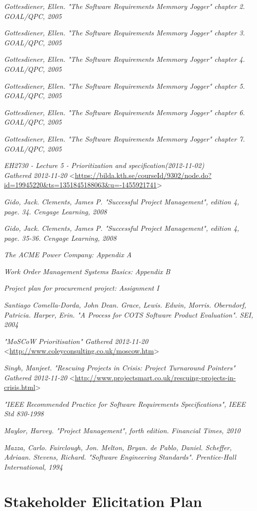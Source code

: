 \documentclass[a4paper]{article}
\begin{document}
\begin{thebibliography}{99}     
	
 \emph{Gottesdiener, Ellen. \textsl{"The Software Requirements Memmory Jogger" chapter 2}. GOAL/QPC, 2005}

 \emph{Gottesdiener, Ellen. \textsl{"The Software Requirements Memmory Jogger" chapter 3}. GOAL/QPC, 2005}

 \emph{Gottesdiener, Ellen. \textsl{"The Software Requirements Memmory Jogger" chapter 4}. GOAL/QPC, 2005}

 \emph{Gottesdiener, Ellen. \textsl{"The Software Requirements Memmory Jogger" chapter 5}. GOAL/QPC, 2005}

 \emph{Gottesdiener, Ellen. \textsl{"The Software Requirements Memmory Jogger" chapter 6}. GOAL/QPC, 2005}

 \emph{Gottesdiener, Ellen. \textsl{"The Software Requirements Memmory Jogger" chapter 7}. GOAL/QPC, 2005}

 \emph{EH2730 - Lecture 5 - \textsl{Prioritization and specification(2012-11-02)}\\Gathered 2012-11-20} <\url{https://bilda.kth.se/courseId/9302/node.do?id=19945220&ts=1351845188063&u=-1455921741}>

 \emph{Gido, Jack. Clements, James P. \textsl{"Successful Project Management", edition 4, page. 34}. Cengage Learning, 2008}

 \emph{Gido, Jack. Clements, James P. \textsl{"Successful Project Management", edition 4, page. 35-36}. Cengage Learning, 2008}    

 \emph{The ACME Power Company: Appendix A}

 \emph{Work Order Management Systems Basics: Appendix B}

 \emph{Project plan for procurement project: Assignment I}    

 \emph{Santiago Comella-Dorda, John Dean. Grace, Lewis. Edwin, Morris. Oberndorf, Patricia. Harper, Erin. \textsl{"A Process for COTS Software Product Evaluation"}. SEI, 2004}

 \emph{\textsl{"MoSCoW Prioritisation"} Gathered 2012-11-20} <\url{http://www.coleyconsulting.co.uk/moscow.htm}>

 \emph{Singh, Manjeet. \textsl{"Rescuing Projects in Crisis: Project Turnaround Pointers"} Gathered 2012-11-20} <\url{http://www.projectsmart.co.uk/rescuing-projects-in-crisis.html}> 

 \emph{\textsl{"IEEE Recommended Practice for Software Requirements Specifications", IEEE Std 830-1998}  }      

 \emph{Maylor, Harvey. \textsl{"Project Management", forth edition}. Financial Times, 2010}

 \emph{Mazza, Carlo. Fairclough, Jon. Melton, Bryan. de Pablo, Daniel. Scheffer, Adriaan. Stevens, Richard. \textsl{"Software Engineering Standards"}. Prentice-Hall International, 1994 } 

\end{thebibliography}
\clearpage
\appendix
\section{Stakeholder Elicitation Plan}

\end{document}
